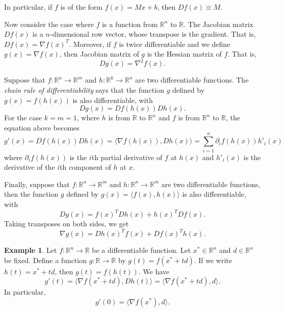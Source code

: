 \documentclass[12pt,oneside]{article}
\newcommand{\ip}[2]{\ensuremath{\langle #1,#2\rangle}}
\newcommand{\Rset}{\mathbb{R}}
\begin{document}
In particular, if $f$ is of the form $f(x)=Mx + b$, then $Df (x) \equiv M$.

\vspace{4mm}

   Now consider the case where $f$ is a function from $\Rset^n$ to $\Rset$. The Jacobian matrix $Df(x)$ is a $n$-dimensional row vector, whose transpose is the gradient. That is, $Df(x) = \nabla f(x)^T$.
 Moreover, if $f$ is twice differentiable and we define $g (x)= \nabla f(x)$, then Jacobian matrix of $g$ is the Hessian matrix of $f$. That is,
 \[Dg(x) = \nabla^2 f(x).\]

\vspace{4mm}

Suppose that $f:\Rset^n\to \Rset^m$ and $h:\Rset^k \to \Rset^n$ are two differentiable functions. The \emph{chain rule of differentiability} says that the function $g$ defined by $g(x) =f( h(x))$ is also differentiable, with
\[
D g(x) = Df(h(x)) Dh(x).
\]
For the case $k=m=1$, where $h$ is from $\Rset$ to $\Rset^n$ and $f$ is from $\Rset^n$ to $\Rset$, the equation above becomes
\[
g'(x)= Df(h(x)) D h(x) = \ip{\nabla f(h(x))}{Dh(x)} = \sum_{i=1}^n \partial_i f (h(x)) h'_i(x)
\]
where $\partial_i f (h(x))$ is the $i$th partial derivative of $f$ at $h(x)$ and $h'_i(x)$ is the derivative of the $i$th component of $h$ at $x$.

\vspace{4mm}

Finally, suppose that $f:\Rset^n \to \Rset^m$ and $h:\Rset^n \to \Rset^m$ are two differentiable functions, then the function $g$ defined by $g(x)=\ip{f(x)}{h(x)}$ is also differentiable, with
\[
D g(x)= f(x)^T Dh(x)  + h(x)^T Df(x).
\]
Taking transposes on both sides, we get
\[
\nabla g(x)= Dh(x)^T f(x)   + Df(x)^T h(x).
\]

\vspace{4mm}

\noindent
\textbf{Example 1}. Let $f: \Rset^n \to \Rset$ be a differentiable function. Let $x^* \in \Rset^n$ and $d \in \Rset^n$ be fixed.
    Define a function $g:\Rset \to \Rset$ by $g(t) = f(x^* + t d)$. If we write $h(t)=x^*+td$, then $g(t)=f(h(t))$. We have
    \[
    g'(t)= \ip{\nabla f(x^*+td)}{ Dh(t)}=\ip{\nabla f(x^*+td)}{d}.
    \]
    In particular,
    \[
    g'(0)= \ip{\nabla f(x^*)}{d}.
    \]

\end{document}
